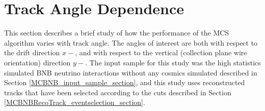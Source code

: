 

	




















\clearpage
\section{Track Angle Dependence}\label{AngleStudy_MCBNBRecoTrack_section}
This section describes a brief study of how the performance of the MCS algorithm varies with track angle. The angles of interest are both with respect to the drift direction $x-$, and with respect to the vertical (collection plane wire orientation) direction $y-$. The input sample for this study was the high statistics simulated BNB neutrino interactions without any cosmics simulated described in Section \ref{MCBNB_input_sample_section}, and this study uses reconstructed tracks that have been selected according to the cuts described in Section \ref{MCBNBRecoTrack_eventselection_section}.\\

